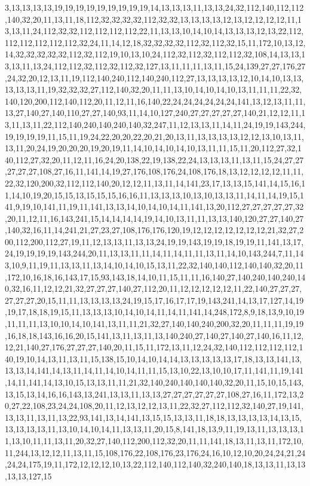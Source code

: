 3,13,13,13,13,19,19,19,19,19,19,19,19,19,14,13,13,13,11,13,13,24,32,112,140,112,112,140,32,20,11,13,11,18,112,32,32,32,32,112,32,32,13,13,13,13,12,13,12,12,12,12,11,13,13,11,24,112,32,32,112,112,112,112,22,11,13,13,10,14,10,14,13,13,13,12,13,22,112,112,112,112,112,112,32,24,11,14,12,18,32,32,32,32,112,32,112,32,15,11,172,10,13,12,14,32,32,32,32,32,112,32,112,19,10,13,10,24,112,32,112,32,112,112,32,108,14,13,13,13,13,11,13,24,112,112,32,112,32,112,32,127,13,11,11,11,13,11,15,24,139,27,27,176,27,24,32,20,12,13,11,19,112,140,240,112,140,240,112,27,13,13,13,13,12,10,14,10,13,13,13,13,13,11,19,32,32,32,27,112,140,32,20,11,11,13,10,14,10,14,10,13,11,11,11,22,32,140,120,200,112,140,112,20,11,12,11,16,140,22,24,24,24,24,24,24,141,13,12,13,11,11,13,27,140,27,140,110,27,27,140,93,11,14,10,127,240,27,27,27,27,27,140,21,12,12,11,13,11,13,11,22,112,140,240,140,240,140,32,247,11,12,13,13,11,14,11,24,19,19,143,244,19,19,19,19,11,15,11,19,24,22,20,20,22,20,21,20,13,11,13,13,13,13,12,12,13,10,13,11,13,11,20,24,19,20,20,20,19,20,19,11,14,10,14,10,14,10,13,11,11,15,11,20,112,27,32,140,112,27,32,20,11,12,11,16,24,20,138,22,19,138,22,24,13,13,13,11,13,11,15,24,27,27,27,27,27,108,27,16,11,141,14,19,27,176,108,176,24,108,176,18,13,12,12,12,12,11,11,22,32,120,200,32,112,112,140,20,12,12,11,13,11,14,141,23,17,13,13,15,141,14,15,16,11,14,10,19,20,15,15,13,15,15,15,16,16,11,13,13,13,10,13,10,13,13,11,14,11,14,19,15,141,9,19,10,141,11,19,11,141,13,13,14,10,14,10,14,11,141,13,20,112,27,27,27,27,27,32,20,11,12,11,16,143,241,15,14,14,14,14,19,14,10,13,11,11,13,13,140,120,27,27,140,27,140,32,16,11,14,241,21,27,23,27,108,176,176,120,19,12,12,12,12,12,12,12,21,32,27,200,112,200,112,27,19,11,12,13,13,11,13,13,24,19,19,143,19,19,18,19,19,11,141,13,17,24,19,19,19,19,143,244,20,11,13,13,11,11,14,11,14,11,11,13,11,14,10,143,244,7,11,143,10,9,11,19,11,13,13,11,13,14,10,14,10,15,13,11,22,32,140,140,112,140,140,32,20,11,172,10,16,18,16,143,17,15,93,143,18,14,10,11,15,11,11,16,140,27,140,240,140,240,140,32,16,11,12,12,21,32,27,27,27,140,27,112,20,11,12,12,12,12,12,11,22,140,27,27,27,27,27,27,20,15,11,11,13,13,13,13,24,19,15,17,16,17,17,19,143,241,14,13,17,127,14,19,19,17,18,18,19,15,11,13,13,13,10,14,10,14,11,14,11,141,14,248,172,8,9,18,13,9,10,19,11,11,11,13,10,10,14,10,141,13,11,11,21,32,27,140,140,240,200,32,20,11,11,11,19,19,16,18,18,143,16,16,20,15,141,13,11,13,11,13,140,240,27,140,27,140,27,140,16,11,12,12,21,140,27,176,27,27,27,140,20,11,15,11,172,13,11,12,24,32,140,112,112,112,112,140,19,10,14,13,11,13,11,15,138,15,10,14,10,14,14,13,13,13,13,13,17,18,13,13,141,13,13,13,14,141,14,13,11,14,11,14,10,14,11,11,15,13,10,22,13,10,10,17,11,141,11,19,141,14,11,141,14,13,10,15,13,13,11,11,21,32,140,240,140,140,140,32,20,11,15,10,15,143,13,15,13,14,16,16,143,13,241,13,13,11,13,13,27,27,27,27,27,27,108,27,16,11,172,13,20,27,22,108,23,24,24,108,20,11,12,13,12,12,13,11,22,32,27,112,112,32,140,27,19,141,13,13,11,13,11,13,22,93,141,13,14,141,13,15,15,13,13,11,18,18,13,13,13,13,14,13,15,13,13,13,13,11,13,10,14,10,14,11,13,13,11,20,15,8,141,18,13,9,11,19,13,11,13,13,13,11,13,10,11,11,13,11,20,32,27,140,112,200,112,32,20,11,11,141,18,13,11,13,11,172,10,11,244,13,12,12,11,13,11,15,108,176,22,108,176,23,176,24,16,10,12,10,20,24,24,21,24,24,24,175,19,11,172,12,12,12,10,13,22,112,140,112,140,32,240,140,18,13,13,11,13,13,13,13,127,15